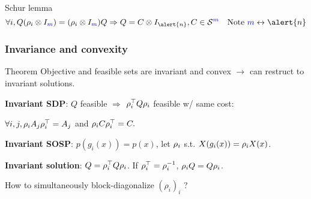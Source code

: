 \begin{frame}{Schur lemma}
  $$\forall i, Q (\induced_i \otimes I_{\textcolor{blue}{m}}) = (\induced_i \otimes I_{\textcolor{blue}{m}}) Q \Rightarrow Q = C \otimes I_{\alert{n}}, C \in \SymK[{\textcolor{blue}{m}}] \quad \text{Note }{\textcolor{blue}{m}} \leftrightarrow \alert{n}$$

\end{frame}

\begin{frame}[fragile]
  \frametitle{Invariance and convexity}
  \begin{block}{Theorem}
    Objective and feasible sets are \alert{invariant} and \alert{convex}
    $\to$
    can restruct to invariant solutions.
  \end{block}

    \textbf{Invariant SDP}:
    $Q$ feasible $\Rightarrow$ $\rho_i^\top Q \rho_i$ feasible w/ same cost:

    $\forall i, j, \rho_i A_j \rho_i^\top = A_j$ and $\rho_i C \rho_i^\top = C.$

    \textbf{Invariant SOSP}:
    $p(g_i(x)) = p(x)$, let $\rho_i$ s.t. $X(g_i(x)) = \rho_i X(x)$.

    \textbf{Invariant solution}:
    $Q = \rho_i^\top Q \rho_i$. If $\rho_i^\top = \rho_i^{-1}$, $\rho_i Q = Q \rho_i$.

  \begin{center}
    How to \alert{simultaneously} block-diagonalize $(\rho_i)_i$ ?
  \end{center}
\end{frame}
